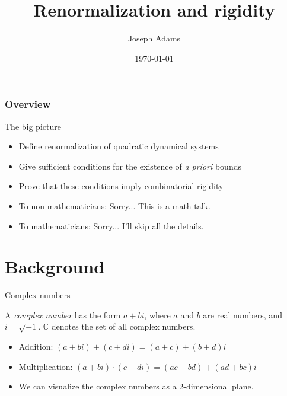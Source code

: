 \documentclass{beamer}
\title{Renormalization and rigidity}
\author{Joseph Adams}
\date{\today}
\begin{document}
\begin{frame}

\titlepage

\end{frame}

\begin{frame}
    \frametitle{Overview}
    \tableofcontents
\end{frame}

\begin{frame}{The big picture}
\begin{itemize}
    \item Define renormalization of quadratic dynamical systems
    \item Give sufficient conditions for the existence of \emph{a priori} bounds
    \item Prove that these conditions imply combinatorial rigidity
    \item To non-mathematicians: Sorry... This is a math talk.
    \item To mathematicians: Sorry... I'll skip all the details.
\end{itemize}
\end{frame}

\section{Background}
\begin{frame}{Complex numbers}

\begin{definition}
A \emph{complex number} has the form $a+bi$, where $a$ and $b$ are real numbers, and $i=\sqrt{-1}$. $\mathbb{C}$ denotes the set of all complex numbers.
\end{definition}

\begin{itemize}
    \item Addition: $(a+bi)+(c+di)=(a+c)+(b+d)i$
    \item Multiplication: $(a+bi)\cdot(c+di)=(ac-bd)+(ad+bc)i$
    \item We can visualize the complex numbers as a 2-dimensional plane.
\end{itemize}

\end{frame}
\end{document}
